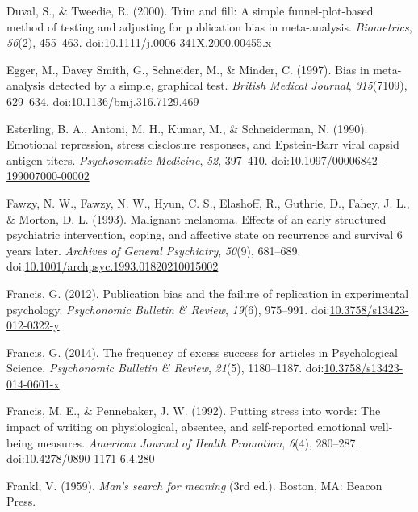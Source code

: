 \documentclass[man, mask]{apa6}
\theoremstyle{definition}
\theoremstyle{definition}
\theoremstyle{definition}
\theoremstyle{remark}
\begin{document}
\hypertarget{ref-Duval2000}{}
Duval, S., \& Tweedie, R. (2000). Trim and fill: A simple
funnel-plot-based method of testing and adjusting for publication bias
in meta-analysis. \emph{Biometrics}, \emph{56}(2), 455--463.
doi:\href{https://doi.org/10.1111/j.0006-341X.2000.00455.x}{10.1111/j.0006-341X.2000.00455.x}

\hypertarget{ref-Egger1997}{}
Egger, M., Davey Smith, G., Schneider, M., \& Minder, C. (1997). Bias in
meta-analysis detected by a simple, graphical test. \emph{British
Medical Journal}, \emph{315}(7109), 629--634.
doi:\href{https://doi.org/10.1136/bmj.316.7129.469}{10.1136/bmj.316.7129.469}

\hypertarget{ref-Esterling1990}{}
Esterling, B. A., Antoni, M. H., Kumar, M., \& Schneiderman, N. (1990).
Emotional repression, stress disclosure responses, and Epstein-Barr
viral capsid antigen titers. \emph{Psychosomatic Medicine}, \emph{52},
397--410.
doi:\href{https://doi.org/10.1097/00006842-199007000-00002}{10.1097/00006842-199007000-00002}

\hypertarget{ref-Fawzy1993}{}
Fawzy, N. W., Fawzy, N. W., Hyun, C. S., Elashoff, R., Guthrie, D.,
Fahey, J. L., \& Morton, D. L. (1993). Malignant melanoma. Effects of an
early structured psychiatric intervention, coping, and affective state
on recurrence and survival 6 years later. \emph{Archives of General
Psychiatry}, \emph{50}(9), 681--689.
doi:\href{https://doi.org/10.1001/archpsyc.1993.01820210015002}{10.1001/archpsyc.1993.01820210015002}

\hypertarget{ref-Francis2012}{}
Francis, G. (2012). Publication bias and the failure of replication in
experimental psychology. \emph{Psychonomic Bulletin \& Review},
\emph{19}(6), 975--991.
doi:\href{https://doi.org/10.3758/s13423-012-0322-y}{10.3758/s13423-012-0322-y}

\hypertarget{ref-Francis2014}{}
Francis, G. (2014). The frequency of excess success for articles in
Psychological Science. \emph{Psychonomic Bulletin \& Review},
\emph{21}(5), 1180--1187.
doi:\href{https://doi.org/10.3758/s13423-014-0601-x}{10.3758/s13423-014-0601-x}

\hypertarget{ref-Francis1992}{}
Francis, M. E., \& Pennebaker, J. W. (1992). Putting stress into words:
The impact of writing on physiological, absentee, and self-reported
emotional well-being measures. \emph{American Journal of Health
Promotion}, \emph{6}(4), 280--287.
doi:\href{https://doi.org/10.4278/0890-1171-6.4.280}{10.4278/0890-1171-6.4.280}

\hypertarget{ref-Frankl1959}{}
Frankl, V. (1959). \emph{Man's search for meaning} (3rd ed.). Boston,
MA: Beacon Press.
\end{document}
